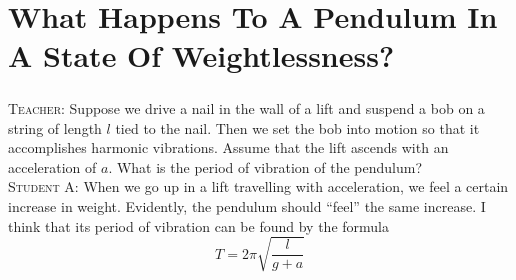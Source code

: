 \documentclass[a4paper,sfsidenotes]{tufte-book}
\begin{document}
\chapter{What Happens To A Pendulum In A State Of Weightlessness?}
\label{ch-12}
\paragraph{}
\textsc{Teacher:} Suppose we drive a nail in the wall of a lift and suspend a bob on a string of length
$l$ tied to the nail. Then we set the bob into motion so that it accomplishes harmonic vibrations. Assume that the lift ascends with an acceleration of $a$. What is the period of vibration of the pendulum?
\\
\textsc{Student A:} When we go up in a lift travelling with acceleration, we feel a certain increase in weight. Evidently, the pendulum should ``feel'' the same increase. I think that its period of vibration can
be found by the formula 
\\
\begin{equation}
T = 2 \pi \sqrt{\frac{l}{g+a}}
\label{77}
\end{equation}
\end{document}
